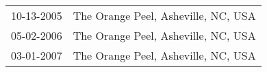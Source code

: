 \begin{supertabular}{ll}
 10-13-2005 &  The Orange Peel, Asheville, NC, USA \\
 05-02-2006 &  The Orange Peel, Asheville, NC, USA \\
 03-01-2007 &  The Orange Peel, Asheville, NC, USA \\
\end{supertabular}
